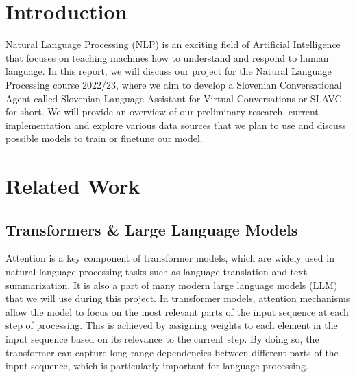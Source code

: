 \documentclass[fleqn,moreauthors,10pt]{ds_report}
\affiliation{\textit{Advisors: doc. dr. Slavko Žitnik}}
\begin{document}
\flushbottom 

\maketitle 

\thispagestyle{empty} 


\section*{Introduction}
	Natural Language Processing (NLP) is an exciting field of Artificial Intelligence that focuses on teaching machines how to understand and respond to human language. 
    In this report, we will discuss our project for the Natural Language Processing course 2022/23, where we aim to develop a Slovenian Conversational Agent called Slovenian Language Assistant for Virtual Conversations  or SLAVC for short.
    We will provide an overview of our preliminary research, current implementation and explore various data sources that we plan to use and discuss possible models to train or finetune our model.

    
\section*{Related Work}

\subsection*{Transformers \& Large Language Models}
Attention \cite{vaswani2017attention} is a key component of transformer models, which are widely used in natural language processing tasks such as language translation and text summarization.
It is also a part of many modern large language models (LLM) that we will use during this project.
In transformer models, attention mechanisms allow the model to focus on the most relevant parts of the input sequence at each step of processing.
This is achieved by assigning weights to each element in the input sequence based on its relevance to the current step.
By doing so, the transformer can capture long-range dependencies between different parts of the input sequence, which is particularly important for language processing.
\end{document}
